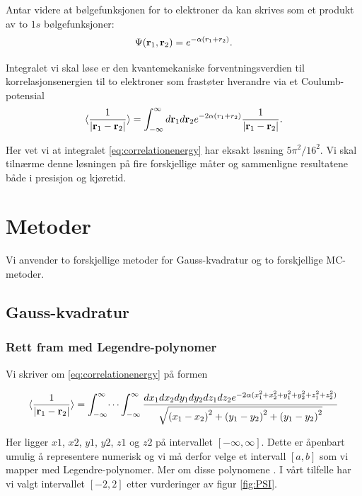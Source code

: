 \documentclass[11pt]{article}
\begin{document}
Antar videre at bølgefunksjonen for to elektroner da kan skrives som et produkt av
to $1s$ bølgefunksjoner:
\[
   \Psi({\bf r}_1,{\bf r}_2)  =   e^{-\alpha (r_1+r_2)}.
\]

Integralet vi skal løse er den kvantemekaniske forventningsverdien
til korrelasjonsenergien til to elektroner som frastøter hverandre via et Coulumb-potensial
\begin{equation}\label{eq:correlationenergy}
   \langle \frac{1}{|{\bf r}_1-{\bf r}_2|} \rangle =
   \int_{-\infty}^{\infty} d{\bf r}_1d{\bf r}_2  e^{-2\alpha (r_1+r_2)}\frac{1}{|{\bf r}_1-{\bf r}_2|}.
\end{equation}

Her vet vi at integralet \eqref{eq:correlationenergy} har eksakt løsning $5\pi^2/16^2$. Vi skal tilnærme denne 
løsningen på fire forskjellige måter og sammenligne resultatene både i presisjon og kjøretid.

\section{Metoder}
Vi anvender to forskjellige metoder for Gauss-kvadratur og to forskjellige MC-metoder.
\subsection{Gauss-kvadratur}
\subsubsection{Rett fram med Legendre-polynomer}
Vi skriver om \eqref{eq:correlationenergy} på formen

\begin{align}\label{eq:xyzINT} 
  \langle \frac{1}{|{\bf r}_1-{\bf r}_2|} \rangle =
   \int_{-\infty}^{\infty} \dots \int_{-\infty}^{\infty}
   \frac{d{x}_1d{x}_2d{y}_1d{y}_2d{z}_1d{z}_2  
   e^{-2\alpha (x_1^2+x_2^2+y_1^2+y_2^2+z_1^2+z_2^2)}}{ \sqrt{{(x_1-x_2)}^2+{(y_1-y_2)}^2+{(y_1-y_2)}^2}}
\end{align}

Her ligger $x1$, $x2$, $y1$, $y2$, $z1$ og $z2$ på intervallet 
$[-\infty, \infty]$. Dette er åpenbart umulig å representere numerisk
og vi må derfor velge et intervall $[a,b]$ som vi mapper med Legendre-polynomer.
Mer om disse polynomene \cite{Lecture-notes}. I vårt tilfelle
har vi valgt intervallet $[-2,2]$ etter vurderinger av figur \ref{fig:PSI}.
\end{document}
